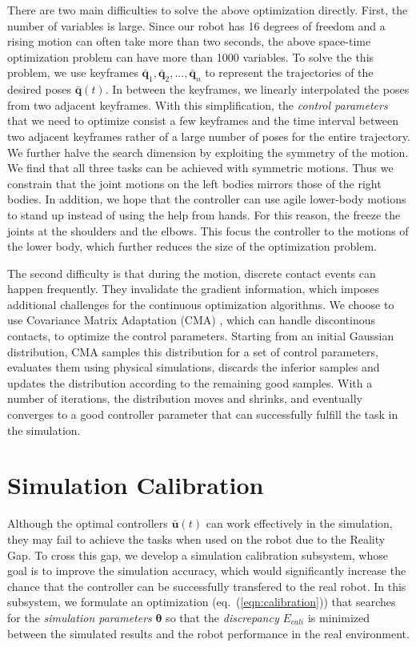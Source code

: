 There are two main difficulties to solve the above optimization directly. First, the number of variables is large. Since our robot has 16 degrees of freedom and a rising motion can often take more than two seconds, the above space-time optimization problem can have more than 1000 variables. To solve the this problem, we use keyframes $\bar{\mathbf{q}}_1, \bar{\mathbf{q}}_2, ..., \bar{\mathbf{q}}_n$ to represent the trajectories of the desired poses $\bar{\mathbf{q}}(t)$. In between the keyframes, we linearly interpolated the poses from two adjacent keyframes. With this simplification, the \emph{control parameters} that we need to optimize consist a few keyframes and the time interval between two adjacent keyframes rather of a large number of poses for the entire trajectory. We further halve the search dimension by exploiting the symmetry of the motion. We find that all three tasks can be achieved with symmetric motions. Thus we constrain that the joint motions on the left bodies mirrors those of the right bodies. In addition, we hope that the controller can use agile lower-body motions to stand up instead of using the help from hands. For this reason, the freeze the joints at the shoulders and the elbows. This focus the controller to the motions of the lower body, which further reduces the size of the optimization problem.

The second difficulty is that during the motion, discrete contact events can happen frequently. They invalidate the gradient information, which imposes additional challenges for the continuous optimization algorithms. We choose to use Covariance Matrix Adaptation (CMA) \cite{Hansen:2009}, which can handle discontinous contacts, to optimize the control parameters. Starting from an initial Gaussian distribution, CMA samples this distribution for a set of control parameters, evaluates them using physical simulations, discards the inferior samples and updates the distribution according to the remaining good samples. With a number of iterations, the distribution moves and shrinks, and eventually converges to a good controller parameter that can successfully fulfill the task in the simulation.

\section{Simulation Calibration}

Although the optimal controllers $\bar{\mathbf{u}}(t)$ can work effectively in the simulation, they may fail to achieve the tasks when used on the robot due to the Reality Gap. To cross this gap, we develop a simulation calibration subsystem, whose goal is to improve the simulation accuracy, which would significantly increase the chance that the controller can be successfully transfered to the real robot. In this subsystem, we formulate an optimization (eq.~(\ref{eqn:calibration})) that searches for the \emph{simulation parameters} $\mathbf{\theta}$ so that the \emph{discrepancy} $E_{cali}$ is minimized between the simulated results and the robot performance in the real environment.

